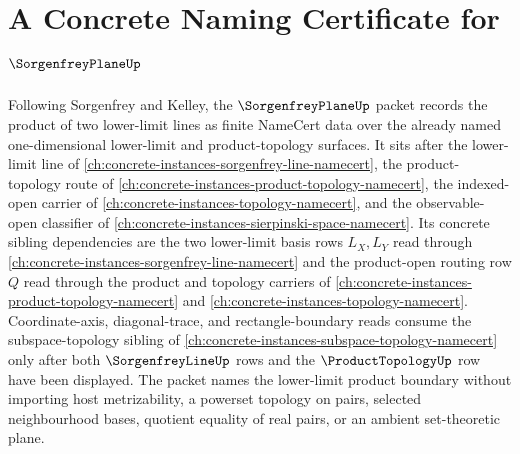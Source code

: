 \chapter{A Concrete Naming Certificate for $\SorgenfreyPlaneUp$}
\label{ch:concrete-instances-sorgenfrey-plane-namecert}

Following Sorgenfrey and Kelley, the $\SorgenfreyPlaneUp$ packet records the product of two lower-limit lines as finite NameCert data over the already named one-dimensional lower-limit and product-topology surfaces. It sits after the lower-limit line of \autoref{ch:concrete-instances-sorgenfrey-line-namecert}, the product-topology route of \autoref{ch:concrete-instances-product-topology-namecert}, the indexed-open carrier of \autoref{ch:concrete-instances-topology-namecert}, and the observable-open classifier of \autoref{ch:concrete-instances-sierpinski-space-namecert}. Its concrete sibling dependencies are the two lower-limit basis rows $L_X,L_Y$ read through \autoref{ch:concrete-instances-sorgenfrey-line-namecert} and the product-open routing row $Q$ read through the product and topology carriers of \autoref{ch:concrete-instances-product-topology-namecert} and \autoref{ch:concrete-instances-topology-namecert}. Coordinate-axis, diagonal-trace, and rectangle-boundary reads consume the subspace-topology sibling of \autoref{ch:concrete-instances-subspace-topology-namecert} only after both $\SorgenfreyLineUp$ rows and the $\ProductTopologyUp$ row have been displayed. The packet names the lower-limit product boundary without importing host metrizability, a powerset topology on pairs, selected neighbourhood bases, quotient equality of real pairs, or an ambient set-theoretic plane.

